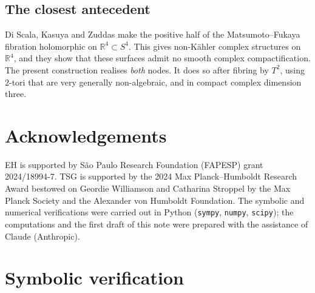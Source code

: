 \documentclass{article}
\theoremstyle{definition}
\theoremstyle{plain}
\newcommand{\R}{\mathbb{R}}
\begin{document}
\subsection*{The closest antecedent}
Di Scala, Kasuya and Zuddas \cite{DKZ17} make the positive half of the
Matsumoto--Fukaya fibration holomorphic on $\R^4\subset S^4$. This gives non-K\"ahler
complex structures on $\R^4$, and they show that these surfaces admit no smooth
complex compactification. The present construction realises \emph{both} nodes. It
does so after fibring by $T^2$, using $2$-tori that are very generally non-algebraic, and in compact complex
dimension three.

\section*{Acknowledgements}
EH is supported by S\~ao Paulo Research Foundation (FAPESP) grant 2024/18994-7.
TSG is supported by the 2024 Max Planck--Humboldt Research Award bestowed on Geordie Williamson and Catharina Stroppel by the Max Planck Society and the Alexander von Humboldt Foundation.
The symbolic and numerical verifications were carried out in Python (\texttt{sympy}, \texttt{numpy}, \texttt{scipy}); the computations and the first draft of this note were prepared with the assistance of Claude (Anthropic).

\appendix
\section{Symbolic verification}\label{app:checks}
\end{document}
